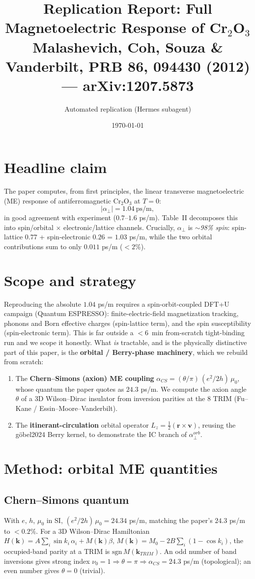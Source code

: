 \documentclass[11pt]{article}
\title{Replication Report: Full Magnetoelectric Response of Cr$_2$O$_3$\\
\large Malashevich, Coh, Souza \& Vanderbilt, PRB \textbf{86}, 094430 (2012) --- arXiv:1207.5873}
\author{Automated replication (Hermes subagent)}
\date{\today}
\begin{document}
\maketitle

\section{Headline claim}
The paper computes, from first principles, the linear transverse magnetoelectric (ME)
response of antiferromagnetic Cr$_2$O$_3$ at $T=0$:
\[
  |\alpha_\perp| = 1.04~\text{ps/m},
\]
in good agreement with experiment ($0.7$--$1.6$ ps/m). Table~II decomposes this into
spin/orbital $\times$ electronic/lattice channels. Crucially, $\alpha_\perp$ is
\emph{$\sim$98\% spin}: spin-lattice $0.77$ + spin-electronic $0.26$ = $1.03$ ps/m,
while the two orbital contributions sum to only $0.011$ ps/m ($<2\%$).

\section{Scope and strategy}
Reproducing the absolute $1.04$ ps/m requires a spin-orbit-coupled DFT+U campaign
(Quantum ESPRESSO): finite-electric-field magnetization tracking, phonons and Born
effective charges (spin-lattice term), and the spin susceptibility (spin-electronic
term). This is far outside a $<6$~min from-scratch tight-binding run and we scope it
honestly. What \emph{is} tractable, and is the physically distinctive part of this
paper, is the \textbf{orbital / Berry-phase machinery}, which we rebuild from scratch:
\begin{enumerate}
  \item The \textbf{Chern--Simons (axion) ME coupling}
        $\alpha_{CS} = (\theta/\pi)\,(e^2/2h)\,\mu_0$, whose quantum the paper quotes
        as $24.3$ ps/m. We compute the axion angle $\theta$ of a 3D Wilson--Dirac
        insulator from inversion parities at the 8 TRIM (Fu--Kane / Essin--Moore--Vanderbilt).
  \item The \textbf{itinerant-circulation} orbital operator $L_z=\tfrac12(\mathbf r\times\mathbf v)$,
        reusing the g\"obel2024 Berry kernel, to demonstrate the IC branch of $\alpha^{orb}_\perp$.
\end{enumerate}

\section{Method: orbital ME quantities}
\subsection{Chern--Simons quantum}
With $e$, $h$, $\mu_0$ in SI, $(e^2/2h)\,\mu_0 = 24.34$ ps/m, matching the paper's
$24.3$ ps/m to $<0.2\%$. For a 3D Wilson--Dirac Hamiltonian
$H(\mathbf k)=A\sum_i\sin k_i\,\alpha_i + M(\mathbf k)\beta$, $M(\mathbf k)=M_0-2B\sum_i(1-\cos k_i)$,
the occupied-band parity at a TRIM is $\mathrm{sgn}\,M(\mathbf k_{TRIM})$. An odd number
of band inversions gives strong index $\nu_0=1\Rightarrow\theta=\pi\Rightarrow
\alpha_{CS}=24.3$ ps/m (topological); an even number gives $\theta=0$ (trivial).
\end{document}
